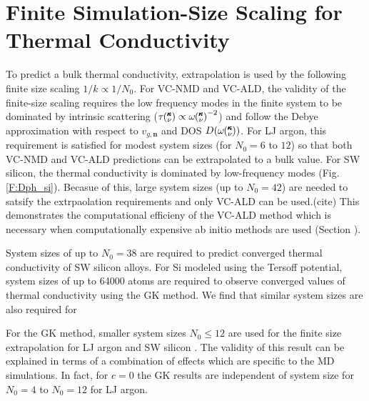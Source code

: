 \documentclass[aps,prb,twocolumn,superscriptaddress,amsmath,amssymb,floatfix]{revtex4}
\newcommand{\kv}{\mspace{-4.0mu}\left(\mspace{-8.0mu}
\begin{smallmatrix}&\pmb{\kappa} \\&\nu\end{smallmatrix}
\mspace{-3.0mu}\right)}
\begin{document}
\section{\label{A:Finite Simulation}
Finite Simulation-Size Scaling for Thermal 
Conductivity}
To predict a bulk thermal conductivity, extrapolation is used by the 
following finite size scaling $ 1 / k \propto 1/N_0$. For VC-NMD and 
VC-ALD, the validity of the finite-size scaling 
requires the low frequency modes in the finite system to be dominated by 
intrinsic scattering ($\tau\kv \propto \omega\kv^{-2}$) and  
follow the Debye approximation 
with respect to $v_{g,\mathbf{n}}$ and DOS $D(\omega\kv)$.
\cite{shiomi_thermal_2011,esfarjani_heat_2011} For LJ 
argon, this requirement is satisfied for modest system sizes 
(for $N_0 = 6$ to $12$) so that both VC-NMD and VC-ALD predictions 
can be extrapolated to a bulk value. 
For SW silicon, the thermal conductivity is dominated by low-frequency 
modes (Fig. \ref{F:Dph_si}). Becasue of this, large system sizes 
(up to $N_0 = 42$) are needed to satsify the 
extrpaolation requirements and only VC-ALD can be used.(cite) This 
demonstrates the computational efficieny of the VC-ALD method which is 
necessary when computationally expensive 
ab initio methods are used (Section ).
\cite{garg_role_2011,tian_phonon_2012,
lindsay_thermal_2012,esfarjani_heat_2011}

System sizes of up to $N_0=38$ are required to predict converged 
thermal conductivity of SW silicon alloys. 
For Si modeled using the Tersoff potential, 
system sizes of up to 64000 atoms are required to observe 
converged values of thermal conductivity using the GK method.
\cite{he_lattice_2012} We find that similar system sizes are 
also required for 

For the GK method, smaller system sizes $N_0 \le 12$ are used for the 
finite size extrapolation for LJ argon and SW silicon . 
The validity of this result can be explained in terms of a 
combination of effects which are specific to the MD simulations.
\cite{esfarjani_heat_2011} In fact, for $c=0$ the GK results are 
independent of system size for $N_0 = 4$ to $N_0 = 12$ for LJ argon.

\clearpage

%

\end{document}
